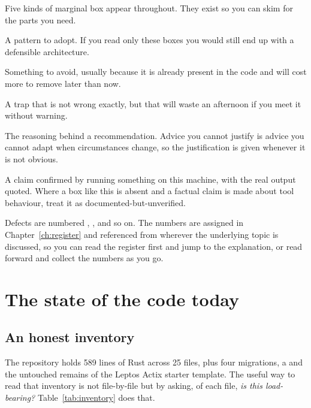 Five kinds of marginal box appear throughout. They exist so you can skim for the parts you need.

\begin{pattern}
A pattern to adopt. If you read only these boxes you would still end up with a
defensible architecture.
\end{pattern}

\begin{antipattern}
Something to avoid, usually because it is already present in the code and will
cost more to remove later than now.
\end{antipattern}

\begin{pitfall}
A trap that is not wrong exactly, but that will waste an afternoon if you meet it
without warning.
\end{pitfall}

\begin{why}
The reasoning behind a recommendation. Advice you cannot justify is advice you cannot
adapt when circumstances change, so the justification is given whenever it is not obvious.
\end{why}

\begin{verified}
A claim confirmed by running something on this machine, with the real output quoted.
Where a box like this is absent and a factual claim is made about tool behaviour, treat it as
documented-but-unverified.
\end{verified}

\vspace{2mm}
Defects are numbered , , and so on. The numbers are assigned in
Chapter~\ref{ch:register} and referenced from wherever the underlying topic is discussed, so you
can read the register first and jump to the explanation, or read forward and collect the
numbers as you go.

\chapter{The state of the code today}
\label{ch:state}

\section{An honest inventory}

The repository holds 589 lines of Rust across 25 files, plus four migrations, a
 and the untouched remains of the Leptos Actix starter template. The
useful way to read that inventory is not file-by-file but by asking, of each file, \emph{is this
load-bearing?} Table~\ref{tab:inventory} does that.

